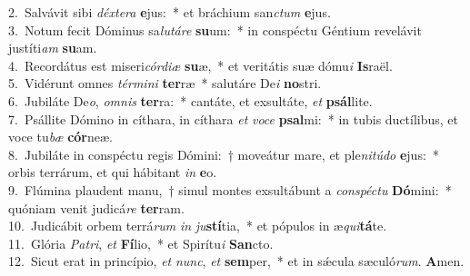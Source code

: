 {2.~}Salvávit sibi \textit{déx}\textit{te}\textit{ra} \textbf{e}jus:~* et bráchium san\textit{ctum} \textbf{e}jus.\\
{3.~}Notum fecit Dóminus sa\textit{lu}\textit{tá}\textit{re} \textbf{su}um:~* in conspéctu Géntium revelávit justíti\textit{am} \textbf{su}am.\\
{4.~}Recordátus est miseri\textit{cór}\textit{di}\textit{æ} \textbf{su}æ,~* et veritátis suæ dómu\textit{i} \textbf{Is}raël.\\
{5.~}Vidérunt omnes \textit{tér}\textit{mi}\textit{ni} \textbf{ter}ræ~* salutáre De\textit{i} \textbf{no}stri.\\
{6.~}Jubiláte De\textit{o}, \textit{om}\textit{nis} \textbf{ter}ra:~* cantáte, et exsultáte, \textit{et} \textbf{psál}lite.\\
{7.~}Psállite Dómino in cíthara, in cíthara \textit{et} \textit{vo}\textit{ce} \textbf{psal}mi:~* in tubis ductílibus, et voce tu\textit{bæ} \textbf{cór}neæ.\\
{8.~}Jubiláte in conspéctu regis Dómini:~† moveátur mare, et ple\textit{ni}\textit{tú}\textit{do} \textbf{e}jus:~* orbis terrárum, et qui hábitant \textit{in} \textbf{e}o.\\
{9.~}Flúmina plaudent manu,~† simul montes exsultábunt a \textit{con}\textit{spé}\textit{ctu} \textbf{Dó}mini:~* quóniam venit judicá\textit{re} \textbf{ter}ram.\\
{10.~}Judicábit orbem terrá\textit{rum} \textit{in} \textit{ju}\textbf{stí}tia,~* et pópulos in æ\textit{qui}\textbf{tá}te.\\
{11.~}Glória \textit{Pa}\textit{tri}, \textit{et} \textbf{Fí}lio,~* et Spirítu\textit{i} \textbf{San}cto.\\
{12.~}Sicut erat in princípio, \textit{et} \textit{nunc}, \textit{et} \textbf{sem}per,~* et in sǽcula sæculó\textit{rum}. \textbf{A}men.\\
